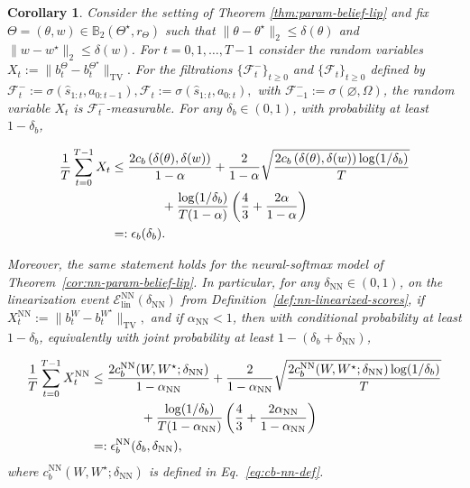 \documentclass[10pt]{article} %
\theoremstyle{plain}
\newtheorem{corollary}[theorem]{Corollary}
\theoremstyle{definition}
\theoremstyle{remark}
\newcommand{\bB}{\mathbb{B}}
\begin{document}
\begin{corollary}\label{cor:belief-good-condition-cor}
Consider the setting of Theorem \ref{thm:param-belief-lip} and fix $\Theta=(\theta,w)\in\bB_2(\Theta^\star,r_\Theta)$ such that $\|\theta-\theta^\star\|_2\le\delta(\theta)$ and $\|w-w^\star\|_2\le\delta(w)$. For $t=0,1,\dots,T-1$ consider the random variables
\(
X_t :=\bigl\|b_t^\Theta-b_t^{\Theta^\star}\bigr\|_{\mathrm{TV}}.\) For the filtrations $\{\mathcal F_t^-\}_{t\ge 0}$ and $\{\mathcal F_t\}_{t\ge 0}$ defined by
\(
\mathcal F_t^- := \sigma(\hat s_{1:t},a_{0:t-1}),\mathcal F_t := \sigma(\hat s_{1:t},a_{0:t}),
\)
with $\mathcal F_{-1}^-:=\sigma(\varnothing,\Omega)$, the random variable $X_t$ is $\mathcal F_t^-$-measurable.  For any $\delta_b\in(0,1)$, with probability at least $1-\delta_b$,

\begin{align}\label{eq:hp-belief-freedman}
\frac{1}{T}\sum_{t=0}^{T-1}X_t &\le \frac{2c_b\,(\delta(\theta),\delta(w))}{1-\alpha} + \frac{2}{1-\alpha}\sqrt{\frac{2 c_b\,(\delta(\theta),\delta(w)) \log(1/\delta_b)}{T}}\notag\\
&\qquad\qquad+ \frac{\log(1/\delta_b)}{T(1-\alpha)}\left(\frac{4}{3} + \frac{2\alpha}{1-\alpha}\right)\\ &=: \epsilon_b(\delta_b).
\end{align}


Moreover, the same statement holds for the neural-softmax model of
Theorem~\ref{cor:nn-param-belief-lip}. In particular, for any
\(\delta_{\mathrm{NN}}\in(0,1)\), on the linearization event
\(\mathcal E_{\mathrm{lin}}^{\mathrm{NN}}(\delta_{\mathrm{NN}})\) from
Definition~\ref{def:nn-linearized-scores}, if \(
X_t^{\mathrm{NN}}:=\bigl\|b_t^W-b_t^{W^\star}\bigr\|_{\mathrm{TV}},
\) and if \(\alpha_{\mathrm{NN}}<1\), then with conditional probability at least \(1-\delta_b\), equivalently with joint probability at least \(1-(\delta_b+\delta_{\mathrm{NN}})\),

\begin{align}\label{eq:hp-belief-freedman-nn}
\frac{1}{T}\sum_{t=0}^{T-1}X_t^{\mathrm{NN}}
&\le \frac{2c_b^{\mathrm{NN}}(W,W^\star;\delta_{\mathrm{NN}})}{1-\alpha_{\mathrm{NN}}} +\frac{2}{1-\alpha_{\mathrm{NN}}}\sqrt{
\frac{2c_b^{\mathrm{NN}}(W,W^\star;\delta_{\mathrm{NN}})\log(1/\delta_b)}{T}}
\notag\\
&\qquad\qquad+\frac{\log(1/\delta_b)}{T(1-\alpha_{\mathrm{NN}})}
\left(\frac{4}{3} +\frac{2\alpha_{\mathrm{NN}}}{1-\alpha_{\mathrm{NN}}}\right)\\
&=:\epsilon_b^{\mathrm{NN}}(\delta_b,\delta_{\mathrm{NN}}),
\end{align}
where \(c_b^{\mathrm{NN}}(W,W^\star;\delta_{\mathrm{NN}})\) is defined in Eq.~\ref{eq:cb-nn-def}.
\end{corollary}
\end{document}
